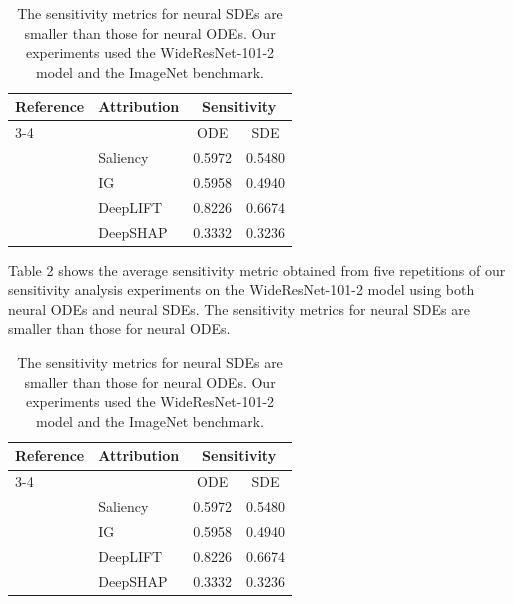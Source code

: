 \documentclass[10pt,twocolumn]{article}
\begin{document}
\begin{table}[h!]
\centering
\caption{The sensitivity metrics for neural SDEs are smaller than those for neural ODEs. Our experiments used the WideResNet-101-2 model and the ImageNet benchmark.}
\begin{tabular}{p{4cm}lcc}
\toprule
Reference & Attribution & \multicolumn{2}{c}{Sensitivity} \\
\cmidrule(lr){3-4}
 &  & ODE & SDE \\
\midrule
\cite{simonyan2014deepinsideconvolutionalnetworks} & Saliency & 0.5972 & 0.5480 \\
\cite{pmlr-v70-sundararajan17a} & IG & 0.5958 & 0.4940 \\
\cite{shrikumar2019learningimportantfeaturespropagating} & DeepLIFT & 0.8226 & 0.6674 \\
\cite{lundberg2017unifiedapproachinterpretingmodel} & DeepSHAP & 0.3332 & 0.3236 \\
\bottomrule
\end{tabular}
\label{tab:wideresnet}
\end{table}

Table 2 shows the average sensitivity metric obtained from five repetitions of our sensitivity analysis experiments on the WideResNet-101-2 model using both neural ODEs and neural SDEs. The sensitivity metrics \cite{adebayo2018sanity} for neural SDEs are smaller than those for neural ODEs.

\begin{table}[h!]
\centering
\caption{The sensitivity metrics for neural SDEs are smaller than those for neural ODEs. Our experiments used the WideResNet-101-2 model and the ImageNet benchmark.}
\begin{tabular}{p{4cm}lcc}
\toprule
Reference & Attribution & \multicolumn{2}{c}{Sensitivity} \\
\cmidrule(lr){3-4}
 &  & ODE & SDE \\
\midrule
\cite{simonyan2014deepinsideconvolutionalnetworks} & Saliency & 0.5972 & 0.5480 \\
\cite{pmlr-v70-sundararajan17a} & IG & 0.5958 & 0.4940 \\
\cite{shrikumar2019learningimportantfeaturespropagating} & DeepLIFT & 0.8226 & 0.6674 \\
\cite{lundberg2017unifiedapproachinterpretingmodel} & DeepSHAP & 0.3332 & 0.3236 \\
\bottomrule
\end{tabular}
\label{tab:wideresnet}
\end{table}
\end{document}
